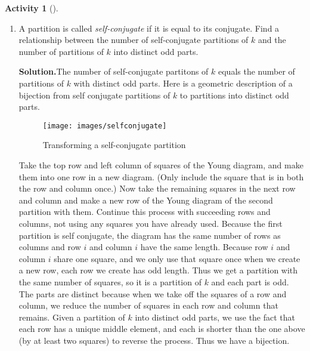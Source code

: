 \documentclass[10pt,]{book}
\theoremstyle{plain}
\theoremstyle{definition}
\newtheorem{activity}[project]{Activity}
\numberwithin{equation}{chapter}
\begin{document}
\begin{activity}[]\label{activity-141}
~\par
\begin{enumerate}[label=(\alph*)]
 \item A partition is called \emph{self-conjugate} if it is equal to its conjugate. Find a relationship between the number of self-conjugate partitions of \(k\) and the number of partitions of \(k\) into distinct odd parts.%
\par\medskip\noindent%
\textbf{Solution.}\quad The number of self-conjugate partitons of \(k\) equals the number of partitions of \(k\) with distinct odd parts. Here is a geometric description of a bijection from self conjugate partitions of \(k\) to partitions into distinct odd parts.%
\begin{figure}
\centering
\texttt{[image: images/selfconjugate]}
\caption{Transforming a self-conjugate partition\label{selfconjugate-to-distinctodd}}
\end{figure}
Take the top row and left column of squares of the Young diagram, and make them into one row in a new diagram. (Only include the square that is in both the row and column once.) Now take the remaining squares in the next row and column and make a new row of the Young diagram of the second partition with them. Continue this process with succeeding rows and columns, not using any squares you have already used. Because the first partition is self conjugate, the diagram has the same number of rows as columns and row \(i\) and column \(i\) have the same length. Because row \(i\) and column \(i\) share one square, and we only use that square once when we create a new row, each row we create has odd length. Thus we get a partition with the same number of squares, so it is a partition of \(k\) and each part is odd. The parts are distinct because when we take off the squares of a row and column, we reduce the number of squares in each row and column that remains. Given a partition of \(k\) into distinct odd parts, we use the fact that each row has a unique middle element, and each is shorter than the one above (by at least two squares) to reverse the process. Thus we have a bijection.%


\end{enumerate}
\end{activity}
\end{document}

